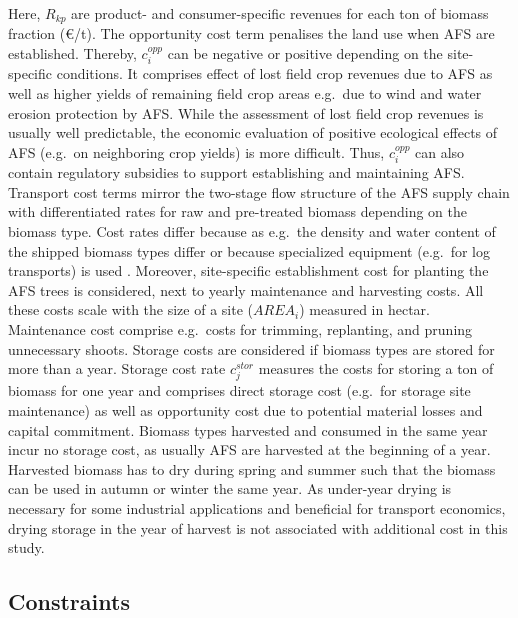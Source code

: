 \documentclass[APA,TimesLARGE]{WileyNJDv5} %
\begin{document}
Here, \(R_{kp}\) are product- and consumer-specific revenues for each ton of biomass fraction (\euro{}{}/t). The opportunity cost term penalises the land use when AFS are established. Thereby, \(c^{{opp}}_i\) can be negative or positive depending on the site-specific conditions. It comprises effect of lost field crop revenues due to AFS as well as higher yields of remaining field crop areas e.g.~due to wind and water erosion protection by AFS. While the assessment of lost field crop revenues is usually well predictable, the economic evaluation of positive ecological effects of AFS (e.g.~on neighboring crop yields) is more difficult. Thus, \(c^{{opp}}_i\) can also contain regulatory subsidies to support establishing and maintaining AFS. Transport cost terms mirror the two-stage flow structure of the AFS supply chain with differentiated rates for raw and pre-treated biomass depending on the biomass type. Cost rates differ because as e.g.~the density and water content of the shipped biomass types differ or because specialized equipment (e.g.~for log transports) is used \cite{vaatainen2021logistics}. Moreover, site-specific establishment cost for planting the AFS trees is considered, next to yearly maintenance and harvesting costs. All these costs scale with the size of a site (\(AREA_i\)) measured in hectar. Maintenance cost comprise e.g.~costs for trimming, replanting, and pruning unnecessary shoots. Storage costs are considered if biomass types are stored for more than a year. Storage cost rate \(c^{{stor}}_j\) measures the costs for storing a ton of biomass for one year and comprises direct storage cost (e.g.~for storage site maintenance) as well as opportunity cost due to potential material losses and capital commitment. Biomass types harvested and consumed in the same year incur no storage cost, as usually AFS are harvested at the beginning of a year. Harvested biomass has to dry during spring and summer such that the biomass can be used in autumn or winter the same year. As under-year drying is necessary for some industrial applications and beneficial for transport economics, drying storage in the year of harvest is not associated with additional cost in this study.

\subsection{Constraints}\label{constraints}
\end{document}
